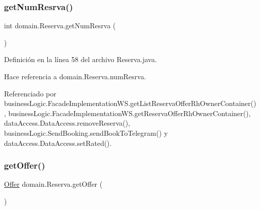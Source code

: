 \mbox{\label{classdomain_1_1_reserva_ad33437c61a742b36c49e5fbf3ae7d715}} 
\subsubsection{\texorpdfstring{getNumResrva()}{getNumResrva()}}
{\footnotesize\ttfamily int domain.\+Reserva.\+get\+Num\+Resrva (\begin{DoxyParamCaption}{ }\end{DoxyParamCaption})}



Definición en la línea 58 del archivo Reserva.\+java.


\begin{DoxyCode}{0}

\end{DoxyCode}


Hace referencia a domain.\+Reserva.\+num\+Resrva.



Referenciado por business\+Logic.\+Facade\+Implementation\+W\+S.\+get\+List\+Reserva\+Offer\+Rh\+Owner\+Container(), business\+Logic.\+Facade\+Implementation\+W\+S.\+get\+Reserva\+Offer\+Rh\+Owner\+Container(), data\+Access.\+Data\+Access.\+remove\+Reserva(), business\+Logic.\+Send\+Booking.\+send\+Book\+To\+Telegram() y data\+Access.\+Data\+Access.\+set\+Rated().

\mbox{\label{classdomain_1_1_reserva_ad1da3466712c5ccaf43cb6f9fe9f5045}} 
\subsubsection{\texorpdfstring{getOffer()}{getOffer()}}
{\footnotesize\ttfamily \mbox{\hyperlink{classdomain_1_1_offer}{Offer}} domain.\+Reserva.\+get\+Offer (\begin{DoxyParamCaption}{ }\end{DoxyParamCaption})}



